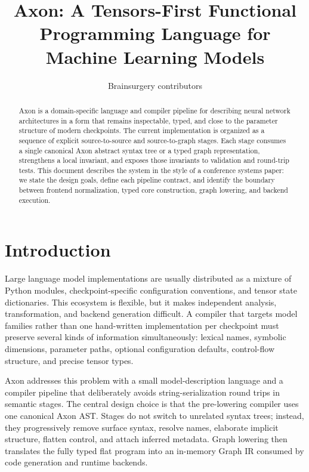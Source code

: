 \documentclass{article}
\title{Axon: A Tensors-First Functional Programming Language for Machine Learning Models}
\author{Brainsurgery contributors}
\begin{document}
\maketitle

\begin{abstract}
Axon is a domain-specific language and compiler pipeline for describing neural
network architectures in a form that remains inspectable, typed, and close to
the parameter structure of modern checkpoints.  The current implementation is
organized as a sequence of explicit source-to-source and source-to-graph
stages.  Each stage consumes a single canonical Axon abstract syntax tree or a
typed graph representation, strengthens a local invariant, and exposes those
invariants to validation and round-trip tests.  This document describes the
system in the style of a conference systems paper: we state the design goals,
define each pipeline contract, and identify the boundary between frontend
normalization, typed core construction, graph lowering, and backend execution.
\end{abstract}

\section{Introduction}

Large language model implementations are usually distributed as a mixture of
Python modules, checkpoint-specific configuration conventions, and tensor
state dictionaries.  This ecosystem is flexible, but it makes independent
analysis, transformation, and backend generation difficult.  A compiler that
targets model families rather than one hand-written implementation per
checkpoint must preserve several kinds of information simultaneously: lexical
names, symbolic dimensions, parameter paths, optional configuration defaults,
control-flow structure, and precise tensor types.

Axon addresses this problem with a small model-description language and a
compiler pipeline that deliberately avoids string-serialization round trips in
semantic stages.  The central design choice is that the pre-lowering compiler
uses one canonical Axon AST.  Stages do not switch to unrelated syntax trees;
instead, they progressively remove surface syntax, resolve names, elaborate
implicit structure, flatten control, and attach inferred metadata.  Graph
lowering then translates the fully typed flat program into an in-memory Graph
IR consumed by code generation and runtime backends.
\end{document}
